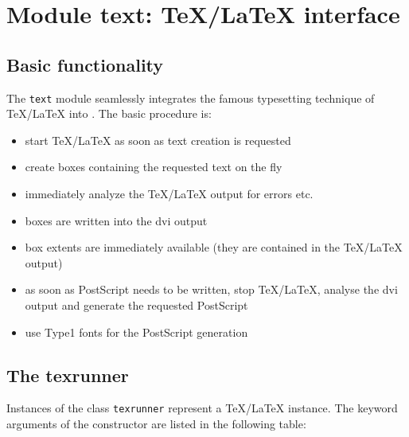 \chapter{Module text: \TeX/\LaTeX{} interface}
\label{module:text}

\section{Basic functionality}

The \verb|text| module seamlessly integrates the famous typesetting
technique of \TeX/\LaTeX{} into \PyX. The basic procedure is:
\begin{itemize}
\item start \TeX/\LaTeX{} as soon as text creation is requested
\item create boxes containing the requested text on the fly
\item immediately analyze the \TeX/\LaTeX{} output for errors etc.
\item boxes are written into the dvi output
\item box extents are immediately available (they are contained in the
\TeX/\LaTeX{} output)
\item as soon as PostScript needs to be written, stop \TeX/\LaTeX{},
analyse the dvi output and generate the requested PostScript
\item use Type1 fonts for the PostScript generation
\end{itemize}

\section{The texrunner}
Instances of the class \verb|texrunner| represent a \TeX/\LaTeX{}
instance. The keyword arguments of the constructor are listed in the
following table:

